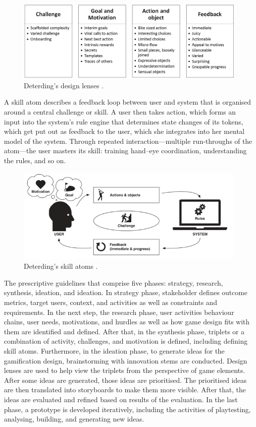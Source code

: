 \documentclass[12pt, a4paper]{report}
\begin{document}
\begin{figure}[ht]
\centering
\includegraphics[width=12cm]{lenses}
\caption{Deterding's design lenses \cite{deterding2015lens}.}
\label{fig:lenses}
\end{figure}


A skill atom describes a feedback loop between user and system that is organised around a central challenge or skill. A user then takes action, which forms an input into the system’s rule engine that determines state changes of its tokens, which get put out as feedback to the user, which she integrates into her mental model of the system. Through repeated interaction—multiple run-throughs of the atom—the user masters its skill: training hand–eye coordination, understanding the rules, and so on.

\begin{figure}[ht]
\centering
\includegraphics[width=12cm]{skill-atoms}
\caption{Deterding's skill atoms \cite{deterding2015lens}.}
\label{fig:skill-atoms}
\end{figure}

The prescriptive guidelines that comprise five phases: strategy, research, synthesis, ideation, and ideation. In strategy phase, stakeholder defines outcome metrics, target users, context, and activities as well as constraints and requirements. In the next step, the research phase, user activities behaviour chains, user needs, motivations, and hurdles as well as how game design fits with them are identified and defined. After that, in the synthesis phase, triplets or a combination of activity, challenges, and motivation is defined, including defining skill atoms. Furthermore, in the ideation phase, to generate ideas for the gamification design, brainstorming with innovation stems are conducted. Design lenses are used to help view the triplets from the perspective of game elements. After some ideas are generated, those ideas are prioritised. The prioritised ideas are then translated into storyboards to make them more visible. After that, the ideas are evaluated and refined based on results of the evaluation. In the last phase, a prototype is developed iteratively, including the activities of playtesting, analysing, building, and generating new ideas. 
\end{document}
